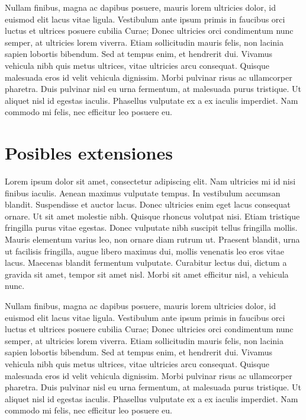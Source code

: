 \documentclass[a4paper,12pt]{article}
\begin{document}
Nullam finibus, magna ac dapibus posuere, mauris lorem ultricies dolor, id euismod elit lacus vitae ligula. Vestibulum ante ipsum primis in faucibus orci luctus et ultrices posuere cubilia Curae; Donec ultricies orci condimentum nunc semper, at ultricies lorem viverra. Etiam sollicitudin mauris felis, non lacinia sapien lobortis bibendum. Sed at tempus enim, et hendrerit dui. Vivamus vehicula nibh quis metus ultrices, vitae ultricies arcu consequat. Quisque malesuada eros id velit vehicula dignissim. Morbi pulvinar risus ac ullamcorper pharetra. Duis pulvinar nisl eu urna fermentum, at malesuada purus tristique. Ut aliquet nisl id egestas iaculis. Phasellus vulputate ex a ex iaculis imperdiet. Nam commodo mi felis, nec efficitur leo posuere eu.

\section{Posibles extensiones}
Lorem ipsum dolor sit amet, consectetur adipiscing elit. Nam ultricies mi id nisi finibus iaculis. Aenean maximus vulputate tempus. In vestibulum accumsan blandit. Suspendisse et auctor lacus. Donec ultricies enim eget lacus consequat ornare. Ut sit amet molestie nibh. Quisque rhoncus volutpat nisi. Etiam tristique fringilla purus vitae egestas. Donec vulputate nibh suscipit tellus fringilla mollis. Mauris elementum varius leo, non ornare diam rutrum ut. Praesent blandit, urna ut facilisis fringilla, augue libero maximus dui, mollis venenatis leo eros vitae lacus. Maecenas blandit fermentum vulputate. Curabitur lectus dui, dictum a gravida sit amet, tempor sit amet nisl. Morbi sit amet efficitur nisl, a vehicula nunc.

Nullam finibus, magna ac dapibus posuere, mauris lorem ultricies dolor, id euismod elit lacus vitae ligula. Vestibulum ante ipsum primis in faucibus orci luctus et ultrices posuere cubilia Curae; Donec ultricies orci condimentum nunc semper, at ultricies lorem viverra. Etiam sollicitudin mauris felis, non lacinia sapien lobortis bibendum. Sed at tempus enim, et hendrerit dui. Vivamus vehicula nibh quis metus ultrices, vitae ultricies arcu consequat. Quisque malesuada eros id velit vehicula dignissim. Morbi pulvinar risus ac ullamcorper pharetra. Duis pulvinar nisl eu urna fermentum, at malesuada purus tristique. Ut aliquet nisl id egestas iaculis. Phasellus vulputate ex a ex iaculis imperdiet. Nam commodo mi felis, nec efficitur leo posuere eu.
\end{document}
